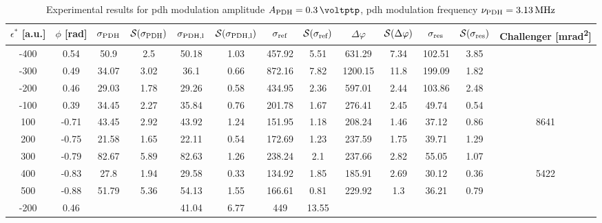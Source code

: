 \begin{landscape}
	
	\begin{table}
	\centering
	\begin{tabular}{|c|c|c|c|c|c|c|c|c|c|c|c|c|}
		\hline
		$\epsilon^*$ [a.u.] & $\phi$ [\si{\radian}] & $\sigma_{\text{PDH}}$ & $\mathcal{S}(\sigma_{\text{PDH}})$ & $\sigma_{\text{PDH,l}}$ & $\mathcal{S}(\sigma_{\text{PDH,l}})$  & $\sigma_{\text{ref}}$ & $\mathcal{S}(\sigma_{\text{ref}})$ & $\Delta \varphi$ & $\mathcal{S}(\Delta \varphi)$ & $\sigma_{\text{res}}$  & $\mathcal{S}(\sigma_{\text{res}})$ & Challenger [\si{\milli\radian\squared}] \\
		\hline
		\hline
		-400 & 0.54 & 50.9 & 2.5 & 50.18 & 1.03 & 457.92 & 5.51 & 631.29 & 7.34 & 102.51 & 3.85 & \\
		-300 & 0.49 & 34.07 & 3.02 & 36.1 & 0.66 & 872.16 & 7.82 & 1200.15 & 11.8 & 199.09 & 1.82 & \\
		-200 & 0.46 & 29.03 & 1.78 & 29.26 & 0.58 & 434.95 & 2.36 & 597.01 & 2.44 & 103.86 & 2.48 & \\
		-100 & 0.39 & 34.45 & 2.27 & 35.84 & 0.76 & 201.78 & 1.67 & 276.41 & 2.45 & 49.74 & 0.54 & \\
		100 & -0.71 & 43.45 & 2.92 & 43.92 & 1.24 & 151.95 & 1.18 & 208.24 & 1.46 & 37.12 & 0.86 & 8641\\
		200 & -0.75 & 21.58 & 1.65 & 22.11 & 0.54 & 172.69 & 1.23 & 237.59 & 1.75 & 39.71 & 1.29 & \\
		300 & -0.79 & 82.67 & 5.89 & 82.63 & 1.26 & 238.24 & 2.1 & 237.66 & 2.82 & 55.05 & 1.07 & \\
		400 & -0.83 & 27.8 & 1.94 & 29.58 & 0.33 & 134.92 & 1.85 & 185.91 & 2.69 & 30.12 & 0.36 & 5422\\
		500 & -0.88 & 51.79 & 5.36 & 54.13 & 1.55 & 166.61 & 0.81 & 229.92 & 1.3 & 36.21 & 0.79 & \\
		\hline
		\hline
		-200 & 0.46 & & & 41.04 & 6.77 & 449 & 13.55 & & & & & \\
		\hline
	\end{tabular}
	\caption{Experimental results for \gls{pdh} modulation amplitude $\tind{A}{PDH} = \SI{0.3}{\voltptp}$, \gls{pdh} modulation frequency $\nu_{\text{PDH}} = \SI{3.13}{\mega\hertz}$}
	\end{table}
	
	

\end{landscape}
